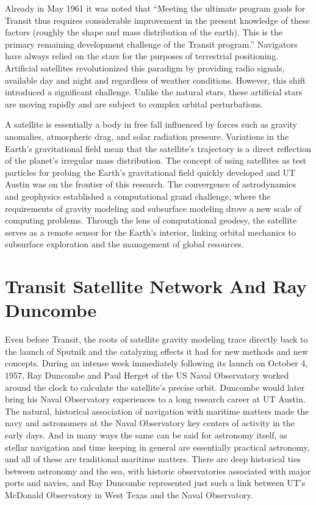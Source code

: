 Already in May 1961 it was noted that “Meeting the ultimate program goals for Transit thus requires considerable improvement in the present knowledge of these factors (roughly the shape and mass distribution of the earth). This is the primary remaining development challenge of the Transit program.” Navigators have always relied on the stars for the purposes of terrestrial positioning. Artificial satellites revolutionized this paradigm by providing radio signals, available day and night and regardless of weather conditions. However, this shift introduced a significant challenge. Unlike the natural stars, these artificial stars are moving rapidly and are subject to complex orbital perturbations. 

A satellite is essentially a body in free fall influenced by forces such as gravity anomalies, atmospheric drag, and solar radiation pressure. Variations in the Earth’s gravitational field mean that the satellite’s trajectory is a direct reflection of the planet's irregular mass distribution. The concept of using satellites as test particles for probing the Earth’s gravitational field quickly developed and UT Austin was on the frontier of this research. The convergence of astrodynamics and geophysics established a computational grand challenge, where the requirements of gravity modeling and subsurface modeling drove a new scale of computing problems. Through the lens of computational geodesy, the satellite serves as a remote sensor for the Earth's interior, linking orbital mechanics to subsurface exploration and the management of global resources. 

\section{Transit Satellite Network And Ray Duncombe}

Even before Transit, the roots of satellite gravity modeling trace directly back to the launch of Sputnik and the catalyzing effects it had for new methods and new concepts. During an intense week immediately following its launch on October 4, 1957, Ray Duncombe and Paul Herget of the US Naval Observatory worked around the clock to calculate the satellite's precise orbit. Duncombe would later bring his Naval Observatory experiences to a long research career at UT Austin. The natural, historical association of navigation with maritime matters made the navy and astronomers at the Naval Observatory key centers of activity in the early days. And in many ways the same can be said for astronomy itself, as stellar navigation and time keeping in general are essentially practical astronomy, and all of these are traditional maritime matters. There are deep historical ties between astronomy and the sea, with historic observatories associated with major ports and navies, and Ray Duncombe represented just such a link between UT’s McDonald Observatory in West Texas and the Naval Observatory.

